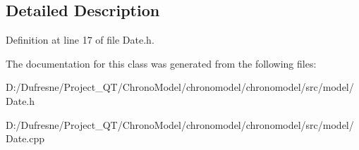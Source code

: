 \subsection{Detailed Description}


Definition at line 17 of file Date.\-h.



The documentation for this class was generated from the following files\-:\begin{DoxyCompactItemize}
\item 
D\-:/\-Dufresne/\-Project\-\_\-\-Q\-T/\-Chrono\-Model/chronomodel/chronomodel/src/model/Date.\-h\item 
D\-:/\-Dufresne/\-Project\-\_\-\-Q\-T/\-Chrono\-Model/chronomodel/chronomodel/src/model/Date.\-cpp\end{DoxyCompactItemize}
